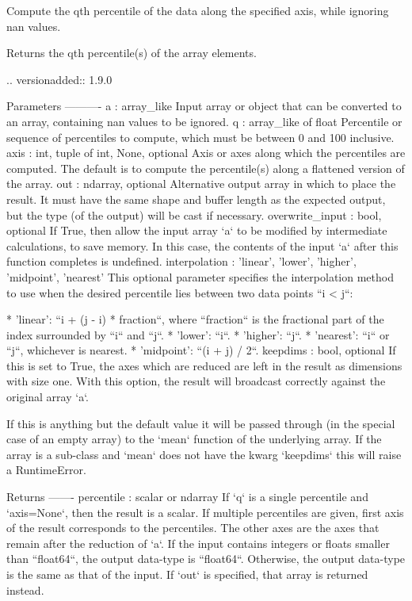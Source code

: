 \begin{DoxyVerb}Compute the qth percentile of the data along the specified axis,
while ignoring nan values.

Returns the qth percentile(s) of the array elements.

.. versionadded:: 1.9.0

Parameters
----------
a : array_like
    Input array or object that can be converted to an array, containing
    nan values to be ignored.
q : array_like of float
    Percentile or sequence of percentiles to compute, which must be between
    0 and 100 inclusive.
axis : {int, tuple of int, None}, optional
    Axis or axes along which the percentiles are computed. The
    default is to compute the percentile(s) along a flattened
    version of the array.
out : ndarray, optional
    Alternative output array in which to place the result. It must
    have the same shape and buffer length as the expected output,
    but the type (of the output) will be cast if necessary.
overwrite_input : bool, optional
    If True, then allow the input array `a` to be modified by intermediate
    calculations, to save memory. In this case, the contents of the input
    `a` after this function completes is undefined.
interpolation : {'linear', 'lower', 'higher', 'midpoint', 'nearest'}
    This optional parameter specifies the interpolation method to
    use when the desired percentile lies between two data points
    ``i < j``:

    * 'linear': ``i + (j - i) * fraction``, where ``fraction``
      is the fractional part of the index surrounded by ``i``
      and ``j``.
    * 'lower': ``i``.
    * 'higher': ``j``.
    * 'nearest': ``i`` or ``j``, whichever is nearest.
    * 'midpoint': ``(i + j) / 2``.
keepdims : bool, optional
    If this is set to True, the axes which are reduced are left in
    the result as dimensions with size one. With this option, the
    result will broadcast correctly against the original array `a`.

    If this is anything but the default value it will be passed
    through (in the special case of an empty array) to the
    `mean` function of the underlying array.  If the array is
    a sub-class and `mean` does not have the kwarg `keepdims` this
    will raise a RuntimeError.

Returns
-------
percentile : scalar or ndarray
    If `q` is a single percentile and `axis=None`, then the result
    is a scalar. If multiple percentiles are given, first axis of
    the result corresponds to the percentiles. The other axes are
    the axes that remain after the reduction of `a`. If the input
    contains integers or floats smaller than ``float64``, the output
    data-type is ``float64``. Otherwise, the output data-type is the
    same as that of the input. If `out` is specified, that array is
    returned instead.


\end{DoxyVerb}
